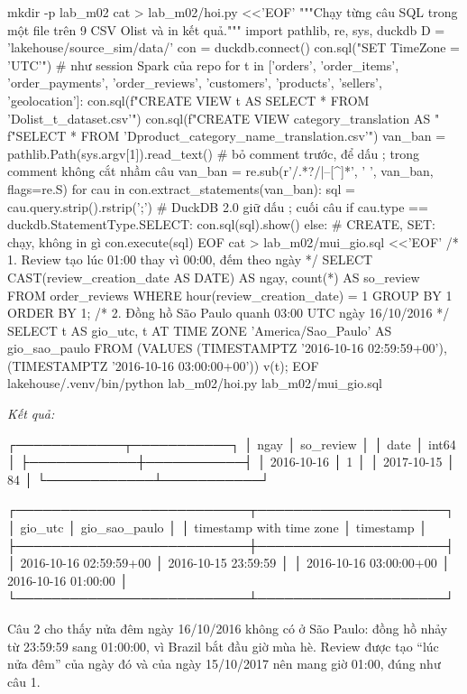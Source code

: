 \begin{codeblock}
mkdir -p lab_m02
cat > lab_m02/hoi.py <<'EOF'
"""Chạy từng câu SQL trong một file trên 9 CSV Olist và in kết quả."""
import pathlib, re, sys, duckdb
D = 'lakehouse/source_sim/data/'
con = duckdb.connect()
con.sql("SET TimeZone = 'UTC'")  # như session Spark của repo
for t in ['orders', 'order_items', 'order_payments', 'order_reviews',
          'customers', 'products', 'sellers', 'geolocation']:
    con.sql(f"CREATE VIEW {t} AS SELECT * FROM '{D}olist_{t}_dataset.csv'")
con.sql(f"CREATE VIEW category_translation AS "
        f"SELECT * FROM '{D}product_category_name_translation.csv'")
van_ban = pathlib.Path(sys.argv[1]).read_text()
# bỏ comment trước, để dấu ; trong comment không cắt nhầm câu
van_ban = re.sub(r'/\*.*?\*/|--[^\n]*', ' ', van_ban, flags=re.S)
for cau in con.extract_statements(van_ban):
    sql = cau.query.strip().rstrip(';')  # DuckDB 2.0 giữ dấu ; cuối câu
    if cau.type == duckdb.StatementType.SELECT:
        con.sql(sql).show()
    else:  # CREATE, SET: chạy, không in gì
        con.execute(sql)
EOF
cat > lab_m02/mui_gio.sql <<'EOF'
/* 1. Review tạo lúc 01:00 thay vì 00:00, đếm theo ngày */
SELECT CAST(review_creation_date AS DATE) AS ngay, count(*) AS so_review
FROM order_reviews WHERE hour(review_creation_date) = 1
GROUP BY 1 ORDER BY 1;
/* 2. Đồng hồ São Paulo quanh 03:00 UTC ngày 16/10/2016 */
SELECT t AS gio_utc, t AT TIME ZONE 'America/Sao_Paulo' AS gio_sao_paulo
FROM (VALUES (TIMESTAMPTZ '2016-10-16 02:59:59+00'),
             (TIMESTAMPTZ '2016-10-16 03:00:00+00')) v(t);
EOF
lakehouse/.venv/bin/python lab_m02/hoi.py lab_m02/mui_gio.sql
\end{codeblock}
\textit{Kết quả:}
\begin{codeblock}
┌────────────┬───────────┐
│    ngay    │ so_review │
│    date    │   int64   │
├────────────┼───────────┤
│ 2016-10-16 │         1 │
│ 2017-10-15 │        84 │
└────────────┴───────────┘

┌──────────────────────────┬─────────────────────┐
│         gio_utc          │    gio_sao_paulo    │
│ timestamp with time zone │      timestamp      │
├──────────────────────────┼─────────────────────┤
│ 2016-10-16 02:59:59+00   │ 2016-10-15 23:59:59 │
│ 2016-10-16 03:00:00+00   │ 2016-10-16 01:00:00 │
└──────────────────────────┴─────────────────────┘
\end{codeblock}

Câu 2 cho thấy nửa đêm ngày 16/10/2016 không có ở São Paulo: đồng hồ nhảy từ 23:59:59 sang 01:00:00, vì Brazil bắt đầu giờ mùa hè. Review được tạo ``lúc nửa đêm'' của ngày đó và của ngày 15/10/2017 nên mang giờ 01:00, đúng như câu 1.

